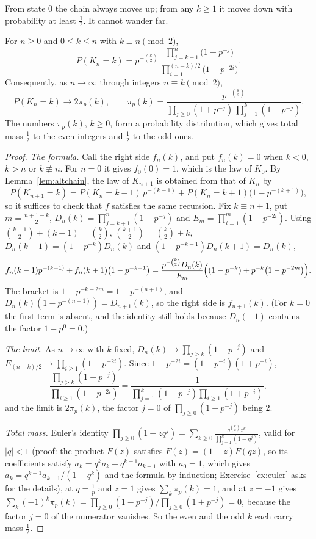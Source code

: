 From state $0$ the chain always moves up; from any $k\ge1$ it moves down with probability at least $\frac12$. It cannot wander far.

\begin{theorem}\label{thm:altlaw}
For $n\ge0$ and $0\le k\le n$ with $k\equiv n\pmod2$,
\[
P(K_n=k)=p^{-\binom k2}\,\frac{\prod_{j=k+1}^{n}\bigl(1-p^{-j}\bigr)}{\prod_{i=1}^{(n-k)/2}\bigl(1-p^{-2i}\bigr)}.
\]
Consequently, as $n\to\infty$ through integers $n\equiv k\pmod2$,
\[
P(K_n=k)\longrightarrow2\pi_p(k),\qquad\pi_p(k)=\frac{p^{-\binom k2}}{\prod_{j\ge0}(1+p^{-j})\,\prod_{j=1}^k(1-p^{-j})}.
\]
The numbers $\pi_p(k)$, $k\ge0$, form a probability distribution, which gives total mass $\frac12$ to the even integers and $\frac12$ to the odd ones.
\end{theorem}
\begin{proof}
\emph{The formula.} Call the right side $f_n(k)$, and put $f_n(k)=0$ when $k<0$, $k>n$ or $k\not\equiv n$. For $n=0$ it gives $f_0(0)=1$, which is the law of $K_0$. By Lemma~\ref{lem:altchain}, the law of $K_{n+1}$ is obtained from that of $K_n$ by
\[
P(K_{n+1}=k)=P(K_n=k-1)\,p^{-(k-1)}+P(K_n=k+1)\bigl(1-p^{-(k+1)}\bigr),
\]
so it suffices to check that $f$ satisfies the same recursion. Fix $k\equiv n+1$, put $m=\frac{n+1-k}2$, $D_n(k)=\prod_{j=k+1}^n(1-p^{-j})$ and $E_m=\prod_{i=1}^m(1-p^{-2i})$. Using $\binom{k-1}2+(k-1)=\binom k2$, $\binom{k+1}2=\binom k2+k$, $D_n(k-1)=(1-p^{-k})D_n(k)$ and $(1-p^{-k-1})D_n(k+1)=D_n(k)$,
\[
f_n(k-1)p^{-(k-1)}+f_n(k+1)\bigl(1-p^{-k-1}\bigr)=\frac{p^{-\binom k2}D_n(k)}{E_m}\Bigl((1-p^{-k})+p^{-k}\bigl(1-p^{-2m}\bigr)\Bigr).
\]
The bracket is $1-p^{-k-2m}=1-p^{-(n+1)}$, and $D_n(k)(1-p^{-(n+1)})=D_{n+1}(k)$, so the right side is $f_{n+1}(k)$. (For $k=0$ the first term is absent, and the identity still holds because $D_n(-1)$ contains the factor $1-p^0=0$.)

\emph{The limit.} As $n\to\infty$ with $k$ fixed, $D_n(k)\to\prod_{j>k}(1-p^{-j})$ and $E_{(n-k)/2}\to\prod_{i\ge1}(1-p^{-2i})$. Since $1-p^{-2i}=(1-p^{-i})(1+p^{-i})$,
\[
\frac{\prod_{j>k}(1-p^{-j})}{\prod_{i\ge1}(1-p^{-2i})}=\frac1{\prod_{j=1}^k(1-p^{-j})\prod_{i\ge1}(1+p^{-i})},
\]
and the limit is $2\pi_p(k)$, the factor $j=0$ of $\prod_{j\ge0}(1+p^{-j})$ being $2$.

\emph{Total mass.} Euler's identity $\prod_{j\ge0}(1+zq^j)=\sum_{k\ge0}\frac{q^{\binom k2}z^k}{\prod_{j=1}^k(1-q^j)}$, valid for $|q|<1$ (proof: the product $F(z)$ satisfies $F(z)=(1+z)F(qz)$, so its coefficients satisfy $a_k=q^ka_k+q^{k-1}a_{k-1}$ with $a_0=1$, which gives $a_k=q^{k-1}a_{k-1}/(1-q^k)$ and the formula by induction; Exercise~\ref{ex:euler} asks for the details), at $q=\frac1p$ and $z=1$ gives $\sum_k\pi_p(k)=1$, and at $z=-1$ gives $\sum_k(-1)^k\pi_p(k)=\prod_{j\ge0}(1-p^{-j})/\prod_{j\ge0}(1+p^{-j})=0$, because the factor $j=0$ of the numerator vanishes. So the even and the odd $k$ each carry mass $\frac12$.
\end{proof}

